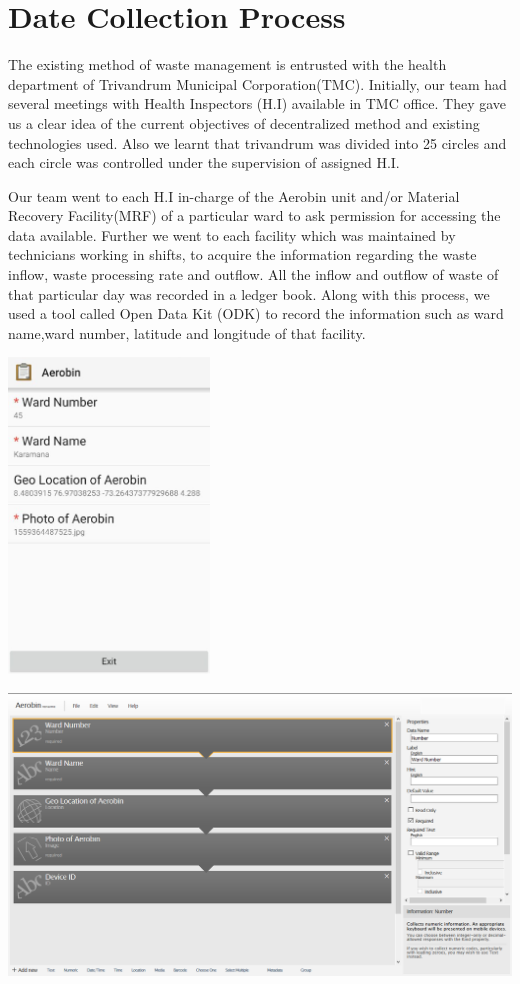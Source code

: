 \documentclass[12pt,a4paper]{  report}
\begin{document}
\chapter{\textbf{Date Collection Process}}
\begin{justify}
	The existing method of waste management is entrusted with the health department of Trivandrum Municipal Corporation(TMC). Initially, our team had several meetings with Health Inspectors (H.I) available in TMC office. They gave us a clear idea of the current objectives of decentralized method and existing technologies used. Also we learnt that trivandrum was divided into 25 circles and each circle was controlled under the supervision of assigned H.I.
	
	Our team went to each H.I in-charge of the Aerobin unit and/or Material Recovery Facility(MRF) of a particular ward to ask permission for accessing the data available. Further we went to each facility which was maintained by technicians working in shifts, to acquire the information regarding the waste inflow, waste processing rate and outflow. All the inflow and outflow of waste of that particular day was recorded in a ledger book. Along with this process, we used a tool called Open Data Kit (ODK) to record the information such as ward name,ward number, latitude and longitude of that facility.
	
	\vspace{5mm}
	\centering
	
	\includegraphics[width=0.4\textwidth]{odk}
	
	\includegraphics[width=1\textwidth]{ODKbuild}	


\end{justify}
\end{document}

